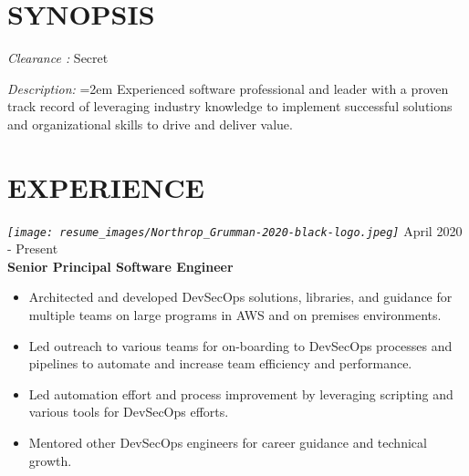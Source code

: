\documentclass[12pt, line, margin]{res}
\begin{document}
    \begin{resume}

        \section{SYNOPSIS}
            {\sl Clearance :} Secret

            {\sl Description:}
              \hangindent=2em
              Experienced software professional and leader with a proven
              track record of leveraging industry knowledge to implement \newline
              successful solutions and organizational skills to drive and deliver
              value.

        \section{EXPERIENCE}
            {\sl
              \texttt{[image: resume\_images/Northrop\_Grumman-2020-black-logo.jpeg]}
            }
            \hfill April 2020 - Present \\
            \textbf{Senior Principal Software Engineer}
            \begin{itemize}  \itemsep -2pt %
              \item   Architected and developed DevSecOps solutions, libraries,
                          and guidance for multiple teams on large programs
                          in AWS and on premises environments.
              \item   Led outreach to various teams for on-boarding to DevSecOps \newline
                          processes and pipelines to automate and increase team efficiency
                          and performance.
              \item   Led automation effort and process improvement by leveraging
                          scripting and various tools for DevSecOps efforts.
              \item   Mentored other DevSecOps engineers for career guidance and
                          technical growth.
            \end{itemize}



\end{resume}
\end{document}
